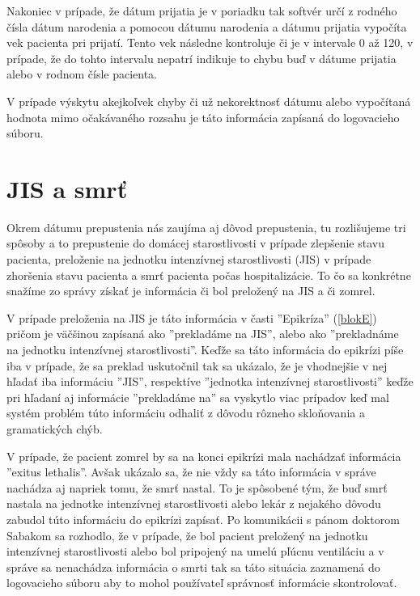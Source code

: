 Nakoniec v prípade, že dátum prijatia je v poriadku tak softvér určí z rodného čísla dátum narodenia a pomocou dátumu narodenia a dátumu prijatia vypočíta vek pacienta pri prijatí. Tento vek následne kontroluje či je v intervale 0 až 120, v prípade, že do tohto intervalu nepatrí indikuje to chybu buď v dátume prijatia alebo v rodnom čísle pacienta.

V prípade výskytu akejkoľvek chyby či už nekorektnosť dátumu alebo vypočítaná hodnota mimo očakávaného rozsahu je táto informácia zapísaná do logovacieho súboru.  

\section{JIS a smrť}

Okrem dátumu prepustenia nás zaujíma aj dôvod prepustenia, tu rozlišujeme tri spôsoby a to prepustenie do domácej starostlivosti v prípade zlepšenie stavu pacienta, preloženie na jednotku intenzívnej starostlivosti (JIS) v prípade zhoršenia stavu pacienta a smrť pacienta počas hospitalizácie. To čo sa konkrétne snažíme zo správy získať je informácia či bol preložený na JIS a či zomrel. 

V prípade preloženia na JIS je táto informácia v časti ''Epikríza'' (\ref{blokE}) pričom je väčšinou zapísaná ako ''prekladáme na JIS'', alebo ako ''prekladnáme na jednotku intenzívnej starostlivosti''. Keďže sa táto informácia do epikrízi píše iba v prípade, že sa preklad uskutočnil tak sa ukázalo, že je vhodnejšie v nej hľadať iba informáciu ''JIS'', respektíve ''jednotka intenzívnej starostlivosti'' keďže pri hľadaní aj informácie ''prekladáme na'' sa vyskytlo viac prípadov keď mal systém problém túto informáciu odhaliť z dôvodu rôzneho skloňovania a gramatických chýb.

V prípade, že pacient zomrel by sa na konci epikrízi mala nachádzať informácia ''exitus lethalis''. Avšak ukázalo sa, že nie vždy sa táto informácia v správe nachádza aj napriek tomu, že smrť nastal. To je spôsobené tým, že buď smrť nastala na jednotke intenzívnej starostlivosti alebo lekár z nejakého dôvodu zabudol túto informáciu do epikrízi zapísať. Po komunikácii s pánom doktorom Sabakom sa rozhodlo, že v prípade, že bol pacient preložený na jednotku intenzívnej starostlivosti alebo bol pripojený na umelú pľúcnu ventiláciu a v správe sa nenachádza informácia o smrti tak sa táto situácia zaznamená do logovacieho súboru aby to mohol používateľ správnosť informácie skontrolovať.

